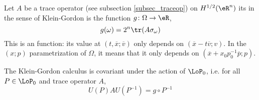 Let $A$ be a trace operator (see subsection \ref{subsec_traceop}) on $H^{1/2}(\eR^n)$ its  in the sense of Klein-Gordon is the function $g\colon \Omega\to \eR$,
\begin{equation}
 g(\omega)=2^n\tr(A\sigma_{\omega})\end{equation}
This is an  function: its value at $(t,\overline{x};\overline{v})$ only depends on $(\overline{x}-t\overline{v};v)$. In the $(x;p)$ parametrization of $\Omega$, it means that it only depends on $(\overline{x}+x_0p_0^{-1}\overline{p};p)$.

\begin{proposition}
The Klein-Gordon calculus is covariant under the action of $\LoP_0$, i.e. for all $P\in\LoP_0$ and trace operator $A$,
\[ 
  U(P)A U(P^{-1})=g\circ P^{-1}
\]

\end{proposition}

